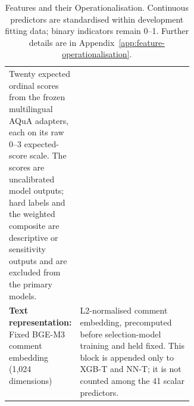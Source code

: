 \begin{table}[t]
\begin{tabular}{@{}p{0.36\linewidth}p{}@{}}
Twenty expected ordinal scores from the frozen multilingual AQuA adapters, each on its raw 0--3 expected-score scale. The scores are uncalibrated model outputs; hard labels and the weighted composite are descriptive or sensitivity outputs and are excluded from the primary models. \\
\textbf{Text representation: }
Fixed BGE-M3 comment embedding (1,024 dimensions) &
L2-normalised comment embedding, precomputed before selection-model training and held fixed. This block is appended only to XGB-T and NN-T; it is not counted among the 41 scalar predictors. \\
\bottomrule
\end{tabular}
\caption{Features and their Operationalisation. Continuous predictors are standardised within development fitting data; binary indicators remain 0--1. Further details are in Appendix~\ref{app:feature-operationalisation}.}
\label{tab:model-features}
\end{table}
